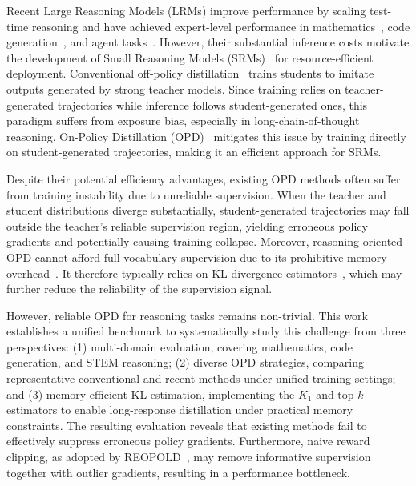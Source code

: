 \documentclass{llmxive}
\providecommand{\cite}[1]{\citep{#1}}
\begin{document}
Recent Large Reasoning Models (LRMs) \cite{zhang2025100,chen2024huatuogpto1medicalcomplexreasoning} improve performance by scaling test-time reasoning and have achieved expert-level performance in mathematics~\cite{ren2025deepseek}, code generation~\cite{anthropic2025claude}, and agent tasks~\cite{ghareeb_robin_2025}.
However, their substantial inference costs motivate the development of Small Reasoning Models (SRMs)~\cite{zhao2025mobilellm} for resource-efficient deployment.
Conventional off-policy distillation~\cite{kim2016sequence} trains students to imitate outputs generated by strong teacher models.
Since training relies on teacher-generated trajectories while inference follows student-generated ones, this paradigm suffers from exposure bias, especially in long-chain-of-thought reasoning.
On-Policy Distillation (OPD)~\cite{lu2025onpolicy,agarwal2024onpolicy} mitigates this issue by training directly on student-generated trajectories, making it an efficient approach for SRMs.

Despite their potential efficiency advantages, existing OPD methods often suffer from training instability due to unreliable supervision. 
When the teacher and student distributions diverge substantially, student-generated trajectories may fall outside the teacher's reliable supervision region, yielding erroneous policy gradients and potentially causing training collapse.
Moreover, reasoning-oriented OPD cannot afford full-vocabulary supervision due to its prohibitive memory overhead~\cite{agarwal2024onpolicy}. 
It therefore typically relies on KL divergence estimators~\cite{lu2025onpolicy}, which may further reduce the reliability of the supervision signal.


However, reliable OPD for reasoning tasks remains non-trivial. 
This work establishes a unified benchmark to systematically study this challenge from three perspectives: 
(1) multi-domain evaluation, covering mathematics, code generation, and STEM reasoning; 
(2) diverse OPD strategies, comparing representative conventional and recent methods under unified training settings; and 
(3) memory-efficient KL estimation, implementing the $K_1$ and top-$k$ estimators to enable long-response distillation under practical memory constraints. 
The resulting evaluation reveals that existing methods fail to effectively suppress erroneous policy gradients. 
Furthermore, naive reward clipping, as adopted by REOPOLD~\cite{ko2026scaling}, may remove informative supervision together with outlier gradients, resulting in a performance bottleneck.
\end{document}
